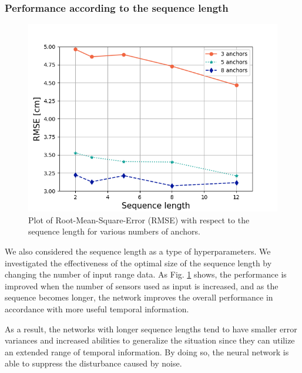 \documentclass[letterpaper, 10 pt, conference]{ieeeconf}
\begin{document}
\subsubsection{Performance according to the sequence length}

\begin{figure}[h!]
	\centering
	\includegraphics[width=0.9\linewidth]{image/RMSE_error}
	\caption{Plot of Root-Mean-Square-Error (RMSE) with respect to the sequence length for various numbers of anchors.}
	\label{fig:seq_length_on_different_anchors} 	
\end{figure}

We also considered the sequence length as a type of hyperparameters. We investigated the effectiveness of the optimal size of the sequence length by changing the number of input range  data. As Fig. \ref{fig:seq_length_on_different_anchors} shows, the performance is improved when the number of sensors used as input is increased, and as the sequence becomes longer, the network improves the overall performance in accordance with more useful temporal information.

As a result, the networks with longer sequence lengths tend to have smaller error variances and increased abilities to generalize the situation since they can utilize an extended range of temporal information. By doing so, the neural network is able to suppress the disturbance caused by noise. 
\end{document}
